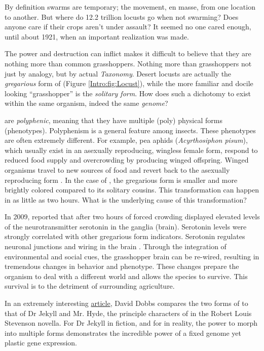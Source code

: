   By definition swarms are temporary; the movement, en masse, from one location to another. But where do 12.2 trillion locusts go when not swarming? Does anyone care if their crops aren't under assault? It seemed no one cared enough, until about 1921, when an important realization was made.

  The power and destruction \locusts{} can inflict makes it difficult to believe that they are nothing more than common grasshoppers. Nothing more than grasshoppers not just by analogy, but by actual \textit{Taxonomy}. Desert locusts are actually the \textit{gregarious} form  of \locusts{} (Figure \ref{Intro:fig:Locust}), while the more familiar and docile looking ``grasshopper'' is the \textit{solitary form}. How does such a dichotomy to exist within the same organism, indeed the same \textit{genome}?

  \locusts{} are \textit{polyphenic}, meaning that they have multiple (poly) physical forms (phenotypes). Polyphenism is a general feature among insects. These phenotypes are often extremely different. For example, pea aphids (\textit{Acyrthosiphon pisum}), which usually exist in an asexually reproducing, wingless female form, respond to reduced food supply and overcrowding by producing winged offspring. Winged organisms travel to new sources of food and revert back to the asexually reproducing form \citep{Shingleton2003,Purandare2014b}. In the case of \locusts{}, the gregarious form is smaller and more brightly colored compared to its solitary cousins. This transformation can happen in as little as two hours. What is the underlying cause of this transformation?

  In 2009, \citet{Anstey2009} reported that after two hours of forced crowding \locusts{} displayed elevated levels of the neurotransmitter serotonin in the ganglia (brain). Serotonin levels were strongly correlated with other gregarious form indicators. Serotonin regulates neuronal junctions and wiring in the brain \citep{Hoeffer2003}. Through the integration of environmental and social cues, the grasshopper brain can be re-wired, resulting in tremendous changes in behavior and phenotype. These changes prepare the organism to deal with a different world and allows the species to survive. This survival is to the detriment of surrounding agriculture.

  In an extremely interesting \href{http://aeon.co/magazine/nature-and-cosmos/why-its-time-to-lay-the-selfish-gene-to-rest/}{article}, David Dobbs compares the two forms of \locusts{} to that of Dr Jekyll and Mr. Hyde, the principle characters of in the Robert Louis Stevenson novella. For Dr Jekyll in fiction, and for \locusts{} in reality, the power to morph into multiple forms demonstrates the incredible power of a fixed genome yet plastic gene expression. 

